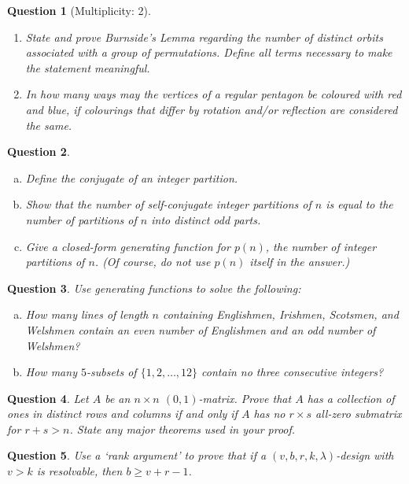 \documentclass[12]{article}
\newtheorem{question}{Question}
\theoremstyle{definition}
\begin{document}
	\begin{question}[Multiplicity: 2]
		\
		\begin{enumerate}
			\item State and prove Burnside's Lemma regarding the number of distinct orbits associated with a group of permutations.  Define all terms necessary to make the statement meaningful.
			\item In how many ways may the vertices of a regular pentagon be coloured with red and blue, if colourings that differ by rotation and/or reflection are considered the same.
		\end{enumerate}
	\end{question}

	\begin{question}
		\
		\begin{enumerate}[a)]
			\item Define the conjugate of an integer partition.
			\item Show that the number of self-conjugate integer partitions of $n$ is equal to the number of partitions of $n$ into distinct odd parts.
			\item Give a closed-form generating function for $p(n)$, the number of integer partitions of $n$.  (Of course, do not use $p(n)$ itself in the answer.)
		\end{enumerate}
	\end{question}

	\begin{question}
		Use generating functions to solve the following:
		\begin{enumerate}[a)]
			\item How many lines of length $n$ containing Englishmen, Irishmen, Scotsmen, and Welshmen contain an even number of Englishmen and an odd number of Welshmen?
			\item How many $5$-subsets of $\{1, 2, \ldots, 12\}$ contain no three consecutive integers?
		\end{enumerate}
	\end{question}

	\begin{question}
		Let $A$ be an $n \times n$ $(0,1)$-matrix.  Prove that $A$ has a collection of ones in distinct rows and columns if and only if $A$ has no $r \times s$ all-zero submatrix for $r+s > n$.  State any major theorems used in your proof.
	\end{question}

	\begin{question}
		Use a `rank argument' to prove that if a $(v, b, r, k, \lambda)$-design with $v > k$ is resolvable, then $b \geq v+r-1$.
	\end{question}
\end{document}
